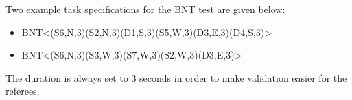 Two example task specifications for the BNT test are given below:

\begin{itemize}
	\item BNT\textless(S6,N,3)(S2,N,3)(D1,S,3)(S5,W,3)(D3,E,3)(D4,S,3)\textgreater {}
	\item BNT\textless(S6,N,3)(S3,W,3)(S7,W,3)(S2,W,3)(D3,E,3)\textgreater
\end{itemize}

The duration is always set to 3 seconds in order to make validation easier for the referees.
%
%
%
%
%
%
%
%
%
